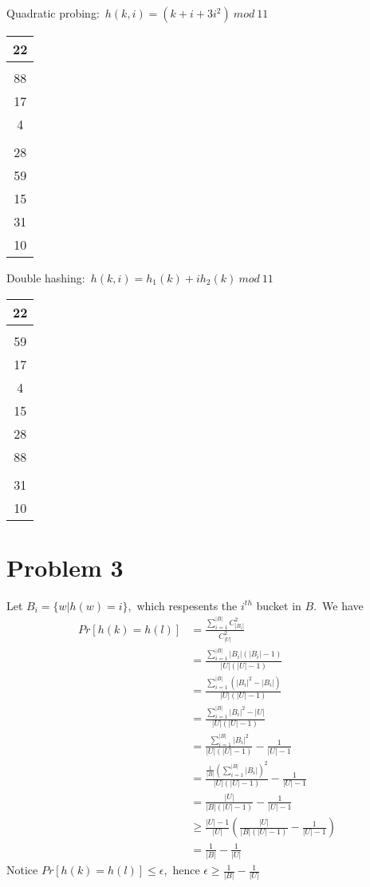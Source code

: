 \documentclass[]{article}
\begin{document}
	Quadratic probing:\ $h(k,i) = (k + i + 3i^2)\ mod\ 11$
	
	\begin{tabular}{|c|}
		\hline
		22\\
		\hline
		\\
		\hline
		88\\
		\hline
		17\\
		\hline
		4\\
		\hline
		\\
		\hline
		28\\
		\hline
		59\\
		\hline
		15\\
		\hline
		31\\
		\hline
		10\\
		\hline
	\end{tabular}

	Double hashing:\ $h(k,i) = h_1(k) + ih_2(k)\ mod\ 11$
	
	\begin{tabular}{|c|}
		\hline
		22\\
		\hline
		\\
		\hline
		59\\
		\hline
		17\\
		\hline
		4\\
		\hline
		15\\
		\hline
		28\\
		\hline
		88\\
		\hline
		\\
		\hline
		31\\
		\hline
		10\\
		\hline
	\end{tabular}

	\section{Problem 3}
	Let $B_i = \{w | h(w) = i\}$,\ which respesents the $i^{th}$ bucket in $B$.\ We have
	\begin{equation*}
		\begin{aligned}
		Pr[h(k) = h(l)] &= \frac{\sum_{i=1}^{|B|}C_{|B_i|}^2}{C_{|U|}^2}\\
		& = \frac{\sum_{i=1}^{|B|}|B_i|(|B_i| - 1)}{|U|(|U|-1)}\\
		& = \frac{\sum_{i=1}^{|B|}(|B_i|^2 - |B_i|)}{|U|(|U|-1)}\\
		& = \frac{\sum_{i=1}^{|B|}|B_i|^2 - |U|}{|U|(|U|-1)}\\
		& = \frac{\sum_{i=1}^{|B|}|B_i|^2}{|U|(|U|-1)} - \frac{1}{|U|-1}\\
		& = \frac{\frac{1}{|B|}(\sum_{i=1}^{|B|}|B_i|)^2}{|U|(|U|-1)} - \frac{1}{|U|-1}\\
		& = \frac{|U|}{|B|(|U|-1)} - \frac{1}{|U|-1}\\
		& \geq \frac{|U|-1}{|U|}(\frac{|U|}{|B|(|U|-1)} - \frac{1}{|U|-1})\\
		& = \frac{1}{|B|} - \frac{1}{|U|}
		\end{aligned}
	\end{equation*}
	Notice $Pr[h(k) = h(l)] \leq \epsilon$,\ hence $\epsilon \geq \frac{1}{|B|} - \frac{1}{|U|}$
\end{document}
